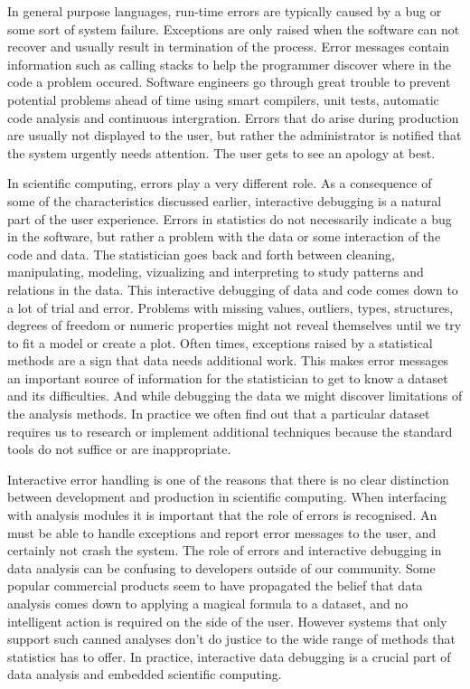 In general purpose languages, run-time errors are typically caused by a bug or some sort of system failure. Exceptions are only raised when the software can not recover and usually result in termination of the process. Error messages contain information such as calling stacks to help the programmer discover where in the code a problem occured. Software engineers go through great trouble to prevent potential problems ahead of time using smart compilers, unit tests, automatic code analysis and continuous intergration. Errors that do arise during production are usually not displayed to the user, but rather the administrator is notified that the system urgently needs attention. The user gets to see an apology at best.

In scientific computing, errors play a very different role. As a consequence of some of the characteristics discussed earlier, interactive debugging is a natural part of the user experience. Errors in statistics do not necessarily indicate a bug in the software, but rather a problem with the data or some interaction of the code and data. The statistician goes back and forth between cleaning, manipulating, modeling, vizualizing and interpreting to study patterns and relations in the data. This interactive debugging of data and code comes down to a lot of trial and error. Problems with missing values, outliers, types, structures, degrees of freedom or numeric properties might not reveal themselves until we try to fit a model or create a plot. Often times, exceptions raised by a statistical methods are a sign that data needs additional work. This makes error messages an important source of information for the statistician to get to know a dataset and its difficulties. And while debugging the data we might discover limitations of the analysis methods. In practice we often find out that a particular dataset requires us to research or implement additional techniques because the standard tools do not suffice or are inappropriate.

Interactive error handling is one of the reasons that there is no clear distinction between development and production in scientific computing. When interfacing with analysis modules it is important that the role of errors is recognised. An \API must be able to handle exceptions and report error messages to the user, and certainly not crash the system. The role of errors and interactive debugging in data analysis can be confusing to developers outside of our community. Some popular commercial products seem to have propagated the belief that data analysis comes down to applying a magical formula to a dataset, and no intelligent action is required on the side of the user. However systems that only support such canned analyses don't do justice to the wide range of methods that statistics has to offer. In practice, interactive data debugging is a crucial part of data analysis and embedded scientific computing.

